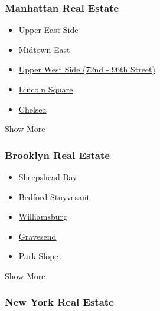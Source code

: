 \hypertarget{manhattan-real-estate}{%
\subsubsection{Manhattan Real Estate}\label{manhattan-real-estate}}

\begin{itemize}
\tightlist
\item
  \href{/real-estate/usa/ny/new-york/upper-east-side/homes-for-sale}{Upper
  East Side}
\item
  \href{/real-estate/usa/ny/new-york/midtown-east/homes-for-sale}{Midtown
  East}
\item
  \href{/real-estate/usa/ny/new-york/upper-west-side-(72nd-96th-street)/homes-for-sale}{Upper
  West Side (72nd - 96th Street)}
\item
  \href{/real-estate/usa/ny/new-york/lincoln-square/homes-for-sale}{Lincoln
  Square}
\item
  \href{/real-estate/usa/ny/new-york/chelsea/homes-for-sale}{Chelsea}
\end{itemize}

Show More

\hypertarget{brooklyn-real-estate}{%
\subsubsection{Brooklyn Real Estate}\label{brooklyn-real-estate}}

\begin{itemize}
\tightlist
\item
  \href{/real-estate/usa/ny/brooklyn/sheepshead-bay/homes-for-sale}{Sheepshead
  Bay}
\item
  \href{/real-estate/usa/ny/brooklyn/bedford-stuyvesant/homes-for-sale}{Bedford
  Stuyvesant}
\item
  \href{/real-estate/usa/ny/brooklyn/williamsburg/homes-for-sale}{Williamsburg}
\item
  \href{/real-estate/usa/ny/brooklyn/gravesend/homes-for-sale}{Gravesend}
\item
  \href{/real-estate/usa/ny/brooklyn/park-slope/homes-for-sale}{Park
  Slope}
\end{itemize}

Show More

\hypertarget{new-york-real-estate}{%
\subsubsection{New York Real Estate}\label{new-york-real-estate}}

